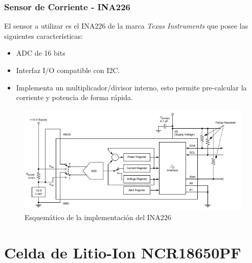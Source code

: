 \documentclass[10pt]{beamer}
\theoremstyle{remark}
\theoremstyle{definition}
\begin{document}
\begin{frame}[allowframebreaks]
  \frametitle{Sensor de Corriente - INA226}
  El sensor a utilizar es el INA226 de la marca \emph{Texas Instruments} que
  posee las siguientes características:
  \begin{itemize}
	\item ADC de 16 bits
	\item Interfaz I/O compatible con I2C.
	\item Implementa un multiplicador/divisor interno, esto permite pre-calcular
	  la corriente y potencia de forma rápida.
  \end{itemize}

  \framebreak

  \begin{figure}[h!]
	\includegraphics[width=1\textwidth]{./images/INA226-Common_Implementation.jpg}
	\caption{Esquemático de la implementación del INA226}
	\label{sch_ina226}
  \end{figure}

\end{frame}


\section{Celda de Litio-Ion NCR18650PF}
\end{document}
